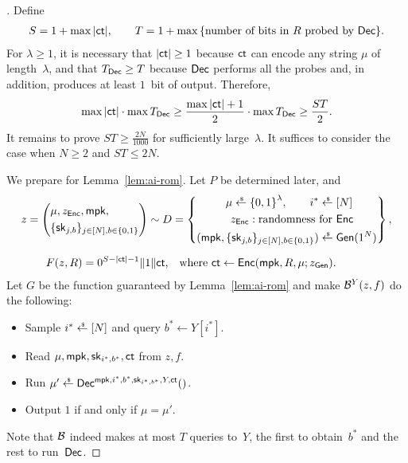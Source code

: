 \begin{proof}[]
Define
\begin{align*}
S=1+\max{|\ct|},\qquad
T=1+\max{\{\textup{number of bits in $R$ probed by $\Dec$}\}}.
\end{align*}
For ${\lambda\geq 1}$, it is necessary
that ${|\ct|\geq 1}$ because $\ct$ can encode any string $\mu$ of length~$\lambda$, and
that ${\TDec\geq T}$ because $\Dec$ performs all the probes and, in addition, produces at least $1$~bit of output.
Therefore,
\begin{align*}
\max{|\ct|}\cdot\max{\TDec}
\geq\frac{\max{|\ct|}+1}{2}\cdot\max{\TDec}
\geq\frac{ST}{2}.
\end{align*}
It remains to prove ${ST\geq\frac{2N}{1000}}$ for sufficiently large~$\lambda$.
It suffices to consider the case when ${N\geq 2}$ and ${ST\leq 2N}$.

We prepare for Lemma~\ref{lem:ai-rom}.
Let $P$ be determined later, and
\begin{align*}
z&{}=\left(\begin{aligned}
&\mu,z_\Enc,\mpk,\\
&\{\sk_{j,b}\}_{j\in[N],b\in\bit}
\end{aligned}\right)\sim D=
\left\{\begin{aligned}
\mu\draws\bit^\lambda,\qquad
i^\ast\draws{}&[N]\\
z_\Enc:\textup{randomness for }&\Enc\\
(\mpk,\{\sk_{j,b}\}_{j\in[N],b\in\bit})\draws{}&\Gen(1^N)
\end{aligned}\right\},\\
\rule[1.5em]{0pt}{0pt}
F(z,R)
\hspace*{-5em}&\hspace*{5em}
{}=0^{S-|\ct|-1}\concat 1\concat\ct\textup{,\quad where }
\ct\gets\Enc(\mpk,R,\mu;z_\Gen).
\end{align*}
Let $G$ be the function guaranteed by Lemma~\ref{lem:ai-rom} and make
${\mathcal{B}}^Y(z,f)$ do the following:
\begin{itemize}
\item Sample ${i^\ast\draws[N]}$ and query ${b^\ast\gets Y[i^\ast]}$.
\item Read $\mu,\mpk,\sk_{i^\ast,b^\ast},\ct$ from $z,f$.
\item Run ${\mu'\draws\Dec^{\mpk,i^\ast,b^\ast,\sk_{i^\ast,b^\ast},Y,\ct}()}$.
\item Output $1$ if and only if ${\mu=\mu'}$.
\end{itemize}
Note that ${\mathcal{B}}$ indeed makes at most $T$ queries to~$Y$,
the first to obtain~$b^\ast$ and the rest to run~$\Dec$.


\end{proof}
